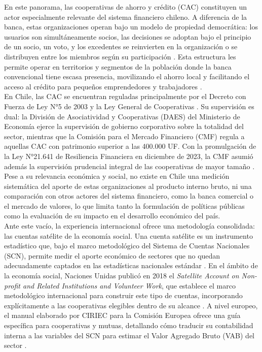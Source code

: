 En este panorama, las cooperativas de ahorro y crédito (CAC) constituyen un actor especialmente relevante del sistema financiero chileno. A diferencia de la banca, estas organizaciones operan bajo un modelo de propiedad democrática: los usuarios son simultáneamente socios, las decisiones se adoptan bajo el principio de un socio, un voto, y los excedentes se reinvierten en la organización o se distribuyen entre los miembros según su participación \cite{vereinte_nationen_satellite_2018}. Esta estructura les permite operar en territorios y segmentos de la población donde la banca convencional tiene escasa presencia, movilizando el ahorro local y facilitando el acceso al crédito para pequeños emprendedores y trabajadores . \\
 
En Chile, las CAC se encuentran reguladas principalmente por el Decreto con Fuerza de Ley N°5 de 2003 y la Ley General de Cooperativas \cite{dfl5_cooperativas_2003}. Su supervisión es dual: la División de Asociatividad y Cooperativas (DAES) del Ministerio de Economía ejerce la supervisión de gobierno corporativo sobre la totalidad del sector, mientras que la Comisión para el Mercado Financiero (CMF) regula a aquellas CAC con patrimonio superior a las 400.000 UF. Con la promulgación de la Ley N°21.641 de Resiliencia Financiera en diciembre de 2023, la CMF asumió además la supervisión
prudencial integral de las cooperativas de mayor tamaño
\cite{ley21641_resiliencia_2023}. Pese a su relevancia económica y social, no existe en Chile una medición sistemática del aporte de estas organizaciones al producto interno bruto, ni una comparación con otros actores del sistema financiero, como la banca comercial o el mercado de valores, lo que limita tanto la formulación de políticas públicas como la evaluación de su impacto en el desarrollo económico del país.\\
 
Ante este vacío, la experiencia internacional ofrece una metodología consolidada: las cuentas satélite de la economía social. Una cuenta satélite es un instrumento estadístico que, bajo el marco metodológico del Sistema de Cuentas Nacionales (SCN), permite medir el aporte económico de sectores que no quedan adecuadamente captados en las estadísticas nacionales estándar \cite{noauthor_cuenta_2006}. En el ámbito de la economía social, Naciones Unidas publicó en 2018 el \textit{Satellite Account on Non-profit and Related Institutions and
Volunteer Work}, que establece el marco metodológico internacional para construir este tipo de cuentas, incorporando explícitamente a las cooperativas elegibles dentro de su alcance \cite{vereinte_nationen_satellite_2018}. A nivel europeo, el manual elaborado por CIRIEC para la Comisión Europea ofrece una guía específica para cooperativas y mutuas, detallando cómo traducir su contabilidad interna a las variables del SCN para estimar el Valor Agregado Bruto (VAB) del sector \cite{barea_tejeiro_manual_2007}.\\
 
